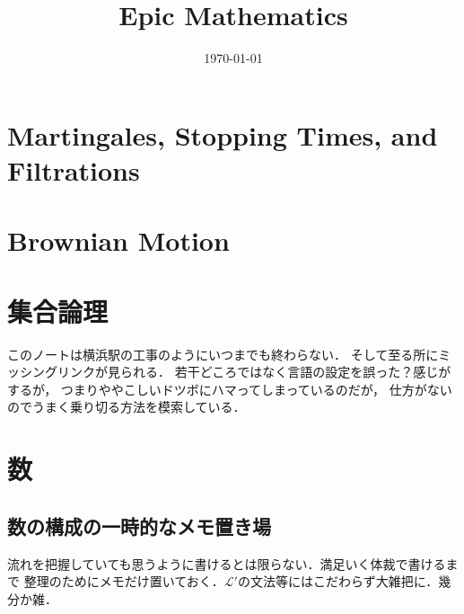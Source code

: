 \documentclass[a4j,10.5pt,oneside,openany]{jsbook}
\title{Epic Mathematics}
\author{}
\date{\today}
\theoremstyle{mystyle}
\begin{document}
%
%
\maketitle


%
%
\tableofcontents
\frontmatter
%
\mainmatter
%
\chapter{Martingales, Stopping Times, and Filtrations}








\chapter{Brownian Motion}









\appendix
\chapter{集合論理}
	このノートは横浜駅の工事のようにいつまでも終わらない．
	そして至る所にミッシングリンクが見られる．
	若干どころではなく言語の設定を誤った？感じがするが，
	つまりややこしいドツボにハマってしまっているのだが，
	仕方がないのでうまく乗り切る方法を模索している．
	\label{sec:logic_and_set_theory}
	
	
	
	
	
	
	
	
	
	
	
	
	

\chapter{数}
	
	
	\section{数の構成の一時的なメモ置き場}
		流れを把握していても思うように書けるとは限らない．満足いく体裁で書けるまで
		整理のためにメモだけ置いておく．$\mathcal{L}'$の文法等にはこだわらず大雑把に．幾分か雑．
		
		
		
	
	
	
	
	
	
	
	
	
\end{document}
